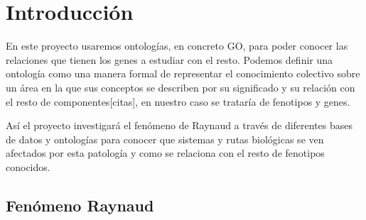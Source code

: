 \section{Introducción}

En este proyecto usaremos ontologías, en concreto GO, para poder conocer las relaciones que tienen los genes a estudiar con el resto. Podemos definir una ontología como una manera formal de representar el conocimiento colectivo sobre un área en la que sus conceptos se describen por su significado y su relación con el resto de componentes[citas], en nuestro caso se trataría de fenotipos y genes. 

Así el proyecto investigará el fenómeno de Raynaud a través de diferentes bases de datos y ontologías para conocer que sistemas y rutas biológicas se ven afectados por esta patología y como se relaciona con el resto de fenotipos conocidos.

\subsection{Fenómeno Raynaud}

